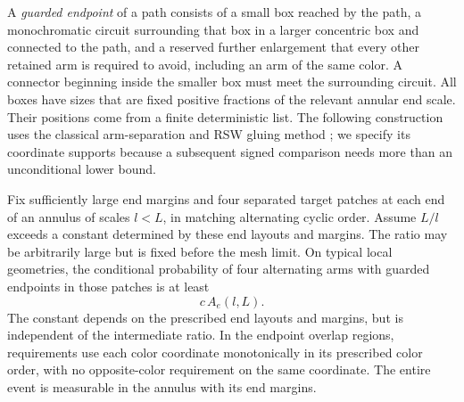A \emph{guarded endpoint} of a path consists of a small box reached by
the path, a monochromatic circuit surrounding that box in a larger
concentric box and connected to the path, and a reserved further
enlargement that every other retained arm is required to avoid, including
an arm of the same color.  A connector beginning inside the
smaller box must meet the surrounding circuit.  All boxes have sizes
that are fixed positive fractions of the relevant annular end scale.
Their positions come from a finite deterministic list.
The following construction uses the classical arm-separation and RSW
gluing method \cite{kesten87,nolin08}; we specify its coordinate supports
because a subsequent signed comparison needs more than an unconditional
lower bound.

\begin{lemma}
\label{lem:guarded-extension}
Fix sufficiently large end margins and four separated target patches at
each end of an annulus of scales $l<L$, in matching alternating cyclic
order.  Assume $L/l$ exceeds a constant determined by these end layouts
and margins.  The ratio may be arbitrarily large but is fixed before the
mesh limit.  On typical local geometries, the conditional probability
of four alternating arms with guarded endpoints in those patches is at
least
\begin{equation}
 c\,A_e(l,L).
 \label{eq:guarded-arms-lower}
\end{equation}
The constant depends on the prescribed end layouts and margins, but is
independent of the intermediate ratio.  In the endpoint overlap regions,
requirements use each color coordinate monotonically in its prescribed
color order, with no opposite-color requirement on the same coordinate.
The entire event is measurable in the annulus with its end margins.
\end{lemma}

